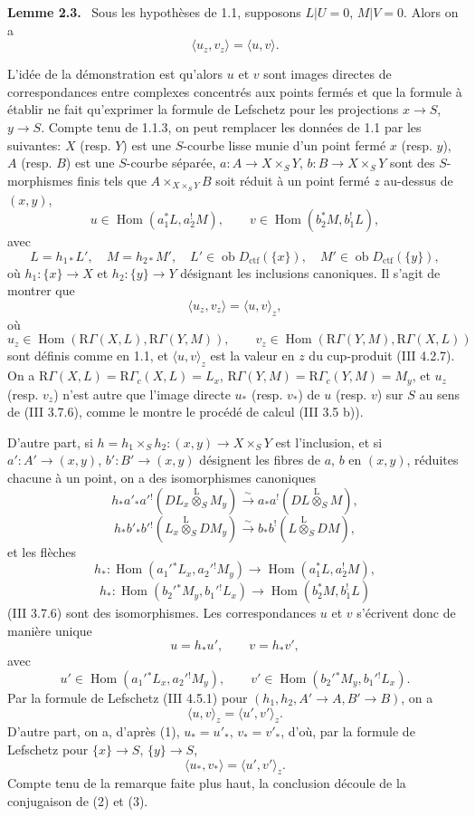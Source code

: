 \documentclass[11pt]{article}
\newenvironment{statement}[1]{\par\medskip\noindent\textbf{#1.}\ }{\par\medskip}
\DeclareMathOperator{\Hom}{Hom}
\providecommand{\lten}{\overset{\mathrm L}{\otimes}}
\providecommand{\Ob}{\operatorname{ob}}
\providecommand{\Hom}{\operatorname{Hom}}
\providecommand{\lten}{\overset{\mathrm L}{\otimes}}
\providecommand{\lten}{\overset{\mathrm L}{\otimes}}
\providecommand{\Ob}{\operatorname{ob}}
\providecommand{\lten}{\overset{\mathrm L}{\otimes}}
\providecommand{\lten}{\overset{\mathrm L}{\otimes}}
\providecommand{\Ob}{\operatorname{Ob}}
\providecommand{\lten}{\overset{\mathrm L}{\otimes}}
\providecommand{\Hom}{\operatorname{Hom}}
\providecommand{\Ob}{\operatorname{ob}}
\providecommand{\Ob}{\operatorname{Ob}}
\providecommand{\lten}{\overset{\mathrm L}{\otimes}}
\begin{document}
\begin{statement}{Lemme 2.3}
Sous les hypothèses de 1.1, supposons $L|U=0$, $M|V=0$. Alors on a
\[
\langle u_z,v_z\rangle=\langle u,v\rangle .
\]
\end{statement}

L'idée de la démonstration est qu'alors $u$ et $v$ sont images directes de correspondances entre complexes concentrés aux points fermés et que la formule à établir ne fait qu'exprimer la formule de Lefschetz pour les projections $x\to S$, $y\to S$. Compte tenu de 1.1.3, on peut remplacer les données de 1.1 par les suivantes: $X$ (resp. $Y$) est une $S$-courbe lisse munie d'un point fermé $x$ (resp. $y$), $A$ (resp. $B$) est une $S$-courbe séparée, $a:A\to X\times_S Y$, $b:B\to X\times_S Y$ sont des $S$-morphismes finis tels que $A\times_{X\times_SY}B$ soit réduit à un point fermé $z$ au-dessus de $(x,y)$,
\[
u\in\Hom(a_1^*L,a_2^!M),\qquad v\in\Hom(b_2^*M,b_1^!L),
\]
avec
\[
L=h_{1*}L',\quad M=h_{2*}M',\quad
L'\in\Ob D_{\mathrm{ctf}}(\{x\}),\quad M'\in\Ob D_{\mathrm{ctf}}(\{y\}),
\]
où $h_1:\{x\}\to X$ et $h_2:\{y\}\to Y$ désignant les inclusions canoniques. Il s'agit de montrer que
\[
\langle u_z,v_z\rangle=\langle u,v\rangle_z,
\]
où
\[
u_z\in\Hom(\mathrm R\Gamma(X,L),\mathrm R\Gamma(Y,M)),\qquad
v_z\in\Hom(\mathrm R\Gamma(Y,M),\mathrm R\Gamma(X,L))
\]
sont définis comme en 1.1, et $\langle u,v\rangle_z$ est la valeur en $z$ du cup-produit (III 4.2.7). On a $\mathrm R\Gamma(X,L)=\mathrm R\Gamma_c(X,L)=L_x$, $\mathrm R\Gamma(Y,M)=\mathrm R\Gamma_c(Y,M)=M_y$, et $u_z$ (resp. $v_z$) n'est autre que l'image directe $u_*$ (resp. $v_*$) de $u$ (resp. $v$) sur $S$ au sens de (III 3.7.6), comme le montre le procédé de calcul (III 3.5 b)).

D'autre part, si $h=h_1\times_Sh_2:(x,y)\to X\times_SY$ est l'inclusion, et si $a':A'\to(x,y)$, $b':B'\to(x,y)$ désignent les fibres de $a$, $b$ en $(x,y)$, réduites chacune à un point, on a des isomorphismes canoniques
\[
h_*a'_*a'{}^!(DL_x\lten_SM_y)
 \xrightarrow{\sim} a_*a^!(DL\lten_SM),
\]
\[
h_*b'_*b'{}^!(L_x\lten_SDM_y)
 \xrightarrow{\sim} b_*b^!(L\lten_SDM),
\]
et les flèches
\[
h_*:\Hom(a_1'{}^*L_x,a_2'{}^!M_y)\to \Hom(a_1^*L,a_2^!M),
\]
\[
h_*:\Hom(b_2'{}^*M_y,b_1'{}^!L_x)\to \Hom(b_2^*M,b_1^!L)
\]
(III 3.7.6) sont des isomorphismes. Les correspondances $u$ et $v$ s'écrivent donc de manière unique
\begin{equation}\tag{1}
u=h_*u',\qquad v=h_*v',
\end{equation}
avec
\[
u'\in\Hom(a_1'{}^*L_x,a_2'{}^!M_y),\qquad
v'\in\Hom(b_2'{}^*M_y,b_1'{}^!L_x).
\]
Par la formule de Lefschetz (III 4.5.1) pour $(h_1,h_2,A'\to A,B'\to B)$, on a
\begin{equation}\tag{2}
\langle u,v\rangle_z=\langle u',v'\rangle_z .
\end{equation}
D'autre part, on a, d'après (1), $u_*=u'_*$, $v_*=v'_*$, d'où, par la formule de Lefschetz pour $\{x\}\to S$, $\{y\}\to S$,
\begin{equation}\tag{3}
\langle u_*,v_*\rangle=\langle u',v'\rangle_z .
\end{equation}
Compte tenu de la remarque faite plus haut, la conclusion découle de la conjugaison de (2) et (3).
\end{document}
